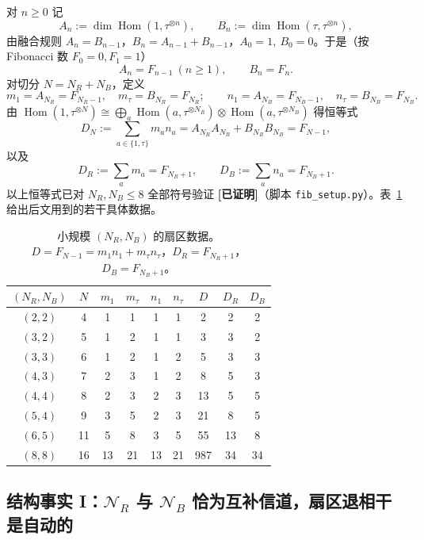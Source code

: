 \documentclass[11pt,a4paper]{ctexart}
\theoremstyle{definition}
\newcommand{\proved}{\textcolor{green!45!black}{\textbf{[已证明]}}}
\newcommand{\Hom}{\operatorname{Hom}}
\begin{document}
对 $n\ge 0$ 记
\[
A_n:=\dim\Hom(1,\tau^{\otimes n}),\qquad B_n:=\dim\Hom(\tau,\tau^{\otimes n}),
\]
由融合规则 $A_n=B_{n-1}$，$B_n=A_{n-1}+B_{n-1}$，$A_0=1,\ B_0=0$。于是（按 Fibonacci 数 $F_0=0,F_1=1$）
\[
A_n=F_{n-1}\ (n\ge1),\qquad B_n=F_n .
\]
对切分 $N=N_R+N_B$，定义
\[
m_1=A_{N_R}=F_{N_R-1},\quad m_\tau=B_{N_R}=F_{N_R};\qquad
n_1=A_{N_B}=F_{N_B-1},\quad n_\tau=B_{N_B}=F_{N_B}.
\]
由 $\Hom(1,\tau^{\otimes N})\cong\bigoplus_a\Hom(a,\tau^{\otimes N_R})\otimes\Hom(a,\tau^{\otimes N_B})$ 得恒等式
\[
D_N:=\sum_{a\in\{1,\tau\}}m_an_a=A_{N_R}A_{N_B}+B_{N_R}B_{N_B}=F_{N-1},
\]
以及
\[
D_R:=\sum_am_a=F_{N_R+1},\qquad D_B:=\sum_an_a=F_{N_B+1}.
\]
以上恒等式已对 $N_R,N_B\le 8$ 全部符号验证 \proved{}（脚本 \texttt{fib\_setup.py}）。表~\ref{tab:fib} 给出后文用到的若干具体数据。

\begin{table}[t]\centering
\caption{小规模 $(N_R,N_B)$ 的扇区数据。$D=F_{N-1}=m_1n_1+m_\tau n_\tau$，$D_R=F_{N_R+1}$，$D_B=F_{N_B+1}$。}
\label{tab:fib}
\begin{tabular}{ccccccccc}
\toprule
$(N_R,N_B)$ & $N$ & $m_1$ & $m_\tau$ & $n_1$ & $n_\tau$ & $D$ & $D_R$ & $D_B$\\
\midrule
$(2,2)$ & 4 & 1 & 1 & 1 & 1 & 2 & 2 & 2\\
$(3,2)$ & 5 & 1 & 2 & 1 & 1 & 3 & 3 & 2\\
$(3,3)$ & 6 & 1 & 2 & 1 & 2 & 5 & 3 & 3\\
$(4,3)$ & 7 & 2 & 3 & 1 & 2 & 8 & 5 & 3\\
$(4,4)$ & 8 & 2 & 3 & 2 & 3 & 13 & 5 & 5\\
$(5,4)$ & 9 & 3 & 5 & 2 & 3 & 21 & 8 & 5\\
$(6,5)$ & 11 & 5 & 8 & 3 & 5 & 55 & 13 & 8\\
$(8,8)$ & 16 & 13 & 21 & 13 & 21 & 987 & 34 & 34\\
\bottomrule
\end{tabular}
\end{table}

\subsection{结构事实 I：$\mathcal N_R$ 与 $\mathcal N_B$ 恰为互补信道，扇区退相干是自动的}
\label{ssec:complement}
\end{document}
